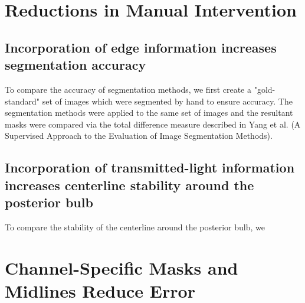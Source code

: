 \section{Reductions in Manual Intervention}

\subsection{Incorporation of edge information increases segmentation accuracy}

To compare the accuracy of segmentation methods, we first create a "gold-standard" set of images which were segmented by hand to ensure accuracy. The segmentation methods were applied to the same set of images and the resultant masks were compared via the total difference measure described in Yang et al. (A Supervised Approach to the Evaluation of Image Segmentation Methods).


\subsection{Incorporation of transmitted-light information increases centerline stability around the posterior bulb}

To compare the stability of the centerline around the posterior bulb, we 

\section{Channel-Specific Masks and Midlines Reduce Error}


